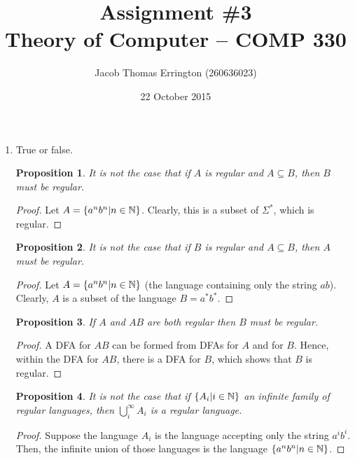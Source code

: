 \documentclass{article}
\author{Jacob Thomas Errington (260636023)}
\date{22 October 2015}
\title{Assignment \#3\\Theory of Computer -- COMP 330}
\newcommand{\N}{{\ensuremath \mathbb{N}}}
\newtheorem{proposition}{Proposition}
\begin{document}
\maketitle

\begin{enumerate}
    \item True or false.

        \begin{proposition}
            It is not the case that if $A$ is regular and 
            $A \subseteq B$, then $B$ must be regular.
        \end{proposition}

        \begin{proof}
            Let $A = \{a^n b^n | n \in \N\}$. Clearly, this is a subset
            of $\Sigma^*$, which is regular.
        \end{proof}

        \begin{proposition}
            It is not the case that if $B$ is regular and 
            $A \subseteq B$, then $A$ must be regular.
        \end{proposition}

        \begin{proof}
            Let $A = \{a^n b^n | n \in \N\}$ (the language containing
            only the string $ab$). Clearly, $A$ is a subset of the
            language $B = a^* b^*$.
        \end{proof}

        \begin{proposition}
            If $A$ and $AB$ are both regular then $B$ must be regular.
        \end{proposition}

        \begin{proof}
            A DFA for $AB$ can be formed from DFAs for $A$ and for $B$.
            Hence, within the DFA for $AB$, there is a DFA for $B$,
            which shows that $B$ is regular.
        \end{proof}

        \begin{proposition}
            It is not the case that if $\{A_i | i \in \N\}$ an infinite
            family of regular languages, then $\bigcup_i^\infty A_i$ is
            a regular language.
        \end{proposition}

        \begin{proof}
            Suppose the language $A_i$ is the language accepting only
            the string $a^i b^i$. Then, the infinite union of those
            languages is the language $\{ a^n b^n | n \in \N \}$.
        \end{proof}


\end{enumerate}
\end{document}
